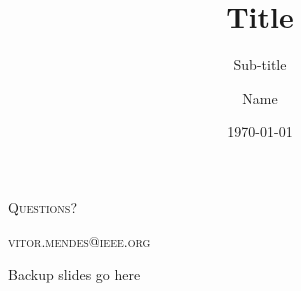 \documentclass{cubeamer}
\title{Title}
\subtitle{Sub-title}
\author[Name]{Name}
\date{\today} %
\institute[SENAI CIMATEC]{SENAI CIMATEC - IEEE ROBOTICS AND AUTOMATION SOCIETY}
\begin{document}
\maketitle

\cutoc







\begin{frame}[standout]
    \Huge\textsc{Questions?}
    
    \vfill
    
    \LARGE\textsc{vitor.mendes@ieee.org}
\end{frame}

\appendix

\begin{frame}{Backup slides go here}
    
\end{frame}
\end{document}
